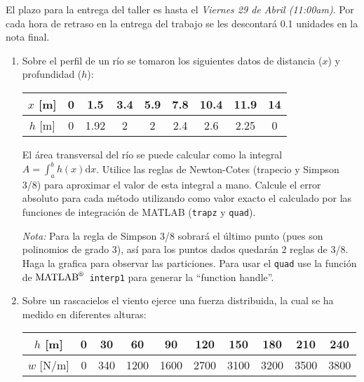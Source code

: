 \documentclass[letterpaper,12pt]{exam}
\newcommand{\matlab}{$\text{MATLAB}^{\text{\textregistered}}$~}
\begin{document}
\begin{center}
\end{center}

\vspace{1cm}
\noindent El plazo para la entrega del taller es hasta el \emph{Viernes 29 de Abril (11:00am)}. Por cada hora de retraso en la entrega del trabajo se les descontará 0.1 unidades en la nota final. 

\begin{enumerate}
 \item Sobre el perfil de un río se tomaron los siguientes datos de distancia ($x$) y profundidad ($h$): 
  \begin{table}[!hb]
  \centering
  \begin{tabular}{c|cccccccc}
   $x$ [m] & 0 & 1.5  & 3.4 & 5.9 & 7.8 & 10.4 & 11.9 & 14  \\
   \hline
   $h$ [m] & 0 & 1.92 & 2   & 2   & 2.4 & 2.6  & 2.25 & 0
  \end{tabular}
 \end{table}
 
 El área transversal del río se puede calcular como la integral $A = \int_{a}^{b} h(x)\mathrm{d}x$. Utilice las reglas de Newton-Cotes (trapecio y Simpson 3/8) para aproximar el valor de esta integral a mano. Calcule el error absoluto para cada método utilizando como valor exacto el calculado por las funciones de integración de MATLAB (\texttt{trapz} y \texttt{quad}). 
 
 \emph{Nota:} Para la regla de Simpson 3/8 sobrará el último punto (pues son polinomios de grado 3), así para los puntos dados quedarán 2 reglas de 3/8. Haga la grafica para observar las particiones. Para usar el \texttt{quad} use la función de \matlab \texttt{interp1} para generar la ``function handle''.

 \item Sobre un rascacielos el viento ejerce una fuerza distribuida, la cual se ha medido en diferentes alturas:
 \begin{table}[!hb]
  \centering
  \begin{tabular}{c|ccccccccc}
   $h$ [m]   & 0 & 30  & 60   & 90   & 120  & 150  & 180  & 210  & 240 \\
   \hline
   $w$ [N/m] & 0 & 340 & 1200 & 1600 & 2700 & 3100 & 3200 & 3500 & 3800
  \end{tabular}
 \end{table}
 

\end{enumerate}
\end{document}
